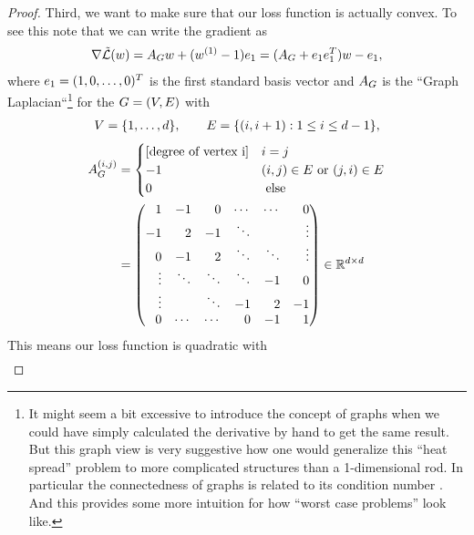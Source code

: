 \begin{proof}
	Third, we want to make sure that our loss function is actually convex. To
	see this note that we can write the gradient as
	\begin{align}\label{eq: naive complexity example loss gradient}
		\nabla \tilde{\mathcal{L}}(w)
		= A_Gw + (w^{(1)} -1) e_1
		= (A_G + e_1 e_1^T)w - e_1,
	\end{align}
	where \(e_1=(1,0,\dots,0)^T\) is the first standard basis
	vector and \(A_G\) is the ``Graph Laplacian``\footnote{
		It might seem a bit excessive to introduce the concept of graphs when
		we could have simply calculated the derivative by hand to get the same
		result. But this graph view is very suggestive how one would generalize
		this ``heat spread'' problem to more complicated structures than a
		1-dimensional rod. In particular the connectedness of graphs is related
		to its condition number \parencite{gohWhyMomentumReally2017}. And this
		provides some more intuition for how ``worst case problems'' look like.
	} for the 
	 \(G=(V, E)\) with 
	\begin{align*}
		V = \{1,\dots, d\},
		\qquad
		E = \{(i, i+1) : 1\le i \le d-1\},
	\end{align*}
	\begin{align*}
		\graphLaplacian^{(i,j)} 
		&= 
		\begin{cases}
			[\text{degree of vertex i}] & i=j\\
			-1 & (i,j)\in\edges \text{ or } (j,i)\in\edges\\
			0 & \text{ else}
		\end{cases}
		\\
		&=
		\begin{pmatrix*}[r]
			1 & -1 & 0  & \cdots & \cdots & 0 \\
			-1 & 2 & -1 & \ddots &  &  \vdots \\ 
			0 & -1 & 2 & \ddots & \ddots & \vdots \\
			\vdots & \ddots & \ddots & \ddots & -1 & 0 \\
			\vdots &  & \ddots & -1 & 2 & -1 \\
			0 & \cdots & \cdots & 0  & -1 & 1
		\end{pmatrix*}\in \reals^{\dimension\times\dimension}
	\end{align*}
	This means our loss function is quadratic with
	\begin{align*}

\end{align*}
\end{proof}
